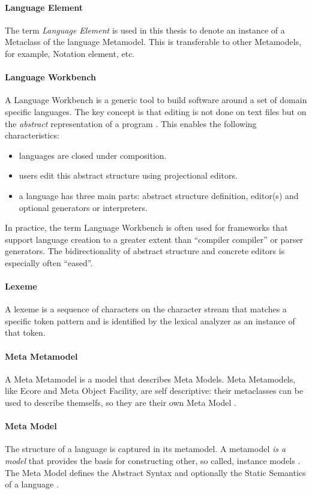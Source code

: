 \paragraph{Language Element} The term \emph{Language Element} is used in this thesis to denote an  instance of a Metaclass of the language Metamodel. This is transferable to other Metamodels, for example, Notation element, etc.

\paragraph{Language Workbench}
A Language Workbench is a generic tool to build software around a set of domain specific languages. The key concept is that editing is not done on text files but on the \emph{abstract} representation of a program \cite{Fowler}. This enables the following characteristics:
\begin{itemize}
	\item languages are closed under composition.
	\item users edit this abstract structure using projectional editors.
	\item a language has three main parts: abstract structure definition, editor(s) and optional generators or interpreters.
\end{itemize}
In practice, the term Language Workbench is often used for frameworks that support language creation to a greater extent than ``compiler compiler'' or parser generators. The bidirectionality of abstract structure and concrete editors is especially often ``eased''. 

\paragraph{Lexeme}
A lexeme is a sequence of characters on the character stream that matches a specific token pattern and is identified by the lexical analyzer as an instance of that token. \cite{DragonBook}

\paragraph{Meta Metamodel} A Meta Metamodel is a model that describes Meta Models. Meta Metamodels, like Ecore and Meta Object Facility, are self descriptive: their metaclasses can be used to describe themselfs, so they are their own Meta Model \cite{EMF2nd}. 

\paragraph{Meta Model} The structure of a language is captured in its metamodel. A metamodel \emph{is a model} that provides the basis for constructing other, so called, instance models \cite{EMP}. The Meta Model defines the Abstract Syntax and optionally the Static Semantics of a language \cite{MDSD}.

